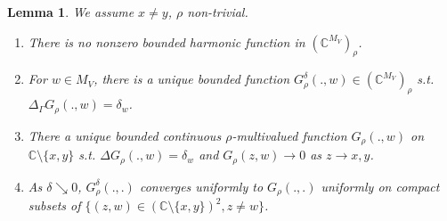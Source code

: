 \documentclass[10pt]{article}
\newcommand{\C}{\mathbb{C}}
\newcommand{\Lap}{\Delta\!}
\newtheorem{Lem}[thm]{Lemma}
\begin{document}
\begin{Lem}\label{Lem:Green2pts}
We assume $x\neq y$, $\rho$ non-trivial.
\begin{enumerate}
\item There is no nonzero bounded harmonic function in $(\C^{M_V})_\rho$.
\item For $w\in M_V$, there is a unique bounded function $G_\rho^\delta(.,w)\in (\C^{M_V})_\rho$ s.t. $\Lap_\Gamma G_\rho(.,w)=\delta_w$.
\item There a unique bounded continuous $\rho$-multivalued function $G_\rho(.,w)$ on $\C\setminus\{x,y\}$ s.t. $\Lap G_\rho(.,w)=\delta_w$ and $G_\rho(z,w)\rightarrow 0$ as $z\rightarrow x,y$.
\item As $\delta\searrow 0$, $G_\rho^\delta(.,.)$ converges uniformly to $G_\rho(.,.)$ uniformly on compact subsets of $\{(z,w)\in (\C\setminus\{x,y\})^2, z\neq w\}$.
\end{enumerate}
\end{Lem}
\end{document}
